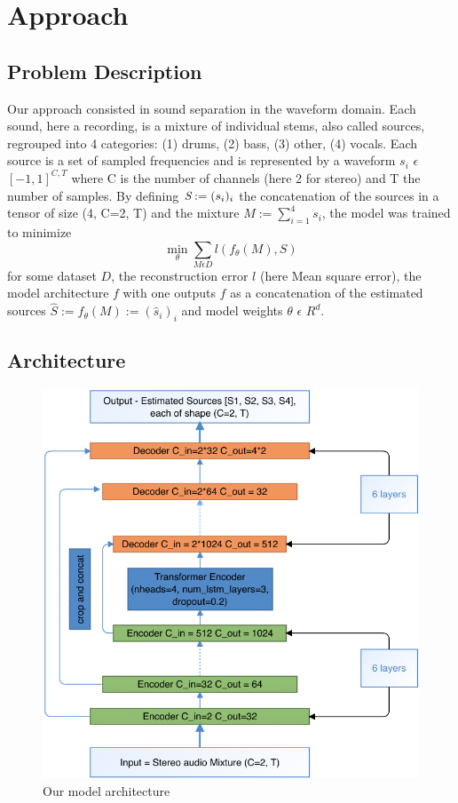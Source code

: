 \documentclass[final]{cvpr}
\begin{document}
\section{Approach}

\subsection{Problem Description}
Our approach consisted in sound separation in the waveform domain. Each sound, here a recording, is a mixture of individual stems, also called sources, regrouped into 4 categories: (1) drums, (2) bass, (3) other, (4) vocals. Each source is a set of sampled frequencies and is represented by a waveform $s_i$ $\epsilon$ ${[-1, 1]}^{C,T}$ where C is the number of channels (here 2 for stereo) and T the number of samples. By defining $\emph{S}:= (s_i)_i$ the concatenation of the sources in a tensor of size (4, C=2, T) and the mixture $M:= \sum^4_{i=1} {s_i}$, the model was trained to minimize
\begin{equation}
\min_{\theta} \sum_{M \epsilon D} l(f_{\theta}(M), S)
\end{equation}
for some dataset $D$, the reconstruction error $l$ (here Mean square error), the model architecture $f$ with one outputs $f$ as a concatenation of the estimated sources $\hat{S}:=f_{\theta}(M):=({\hat{s}_i})_i$ and model weights $\theta$ $\epsilon$ $R^{d}$.

\subsection{Architecture}

\begin{figure}
   \includegraphics[scale=0.3]{architecture.png}
   \caption{Our model architecture}
   \label{our-architecture}
\end{figure}
\end{document}
